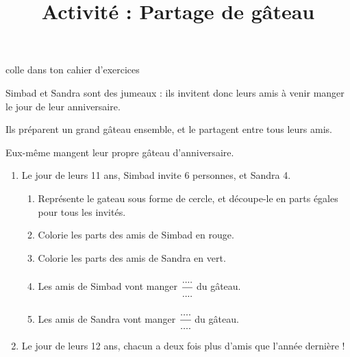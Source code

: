 \documentclass[a4paper,11pt]{article}
\title{Activité : Partage de gâteau}
\date{}
\author{}
\makeatletter
\renewcommand{\maketitle}{%
{\scriptsize colle dans ton cahier d'exercices}
	\begin{center}
		\LARGE
		\uline{\@title}
		\vspace{0.5em}
	\end{center}
}
\makeatother
\begin{document}
\maketitle

\begin{enonce}
	Simbad et Sandra sont des jumeaux : ils invitent donc leurs amis à venir manger le jour de leur anniversaire.

	Ils préparent un grand gâteau ensemble, et le partagent entre tous leurs amis.

	Eux-même mangent leur propre gâteau d'anniversaire.
\end{enonce}

\begin{enumerate}
	\item Le jour de leurs 11 ans, Simbad invite 6 personnes, et Sandra 4.
	      \begin{enumerate}
		      \item Représente le gateau sous forme de cercle, et découpe-le en parts égales pour tous les invités.
		      \item Colorie les parts des amis de Simbad en rouge.
		      \item Colorie les parts des amis de Sandra en vert.
		      \item Les amis de Simbad vont manger $\cfrac{....}{....}$ du gâteau. \vspace{0.5em}
		      \item Les amis de Sandra vont manger $\cfrac{....}{....}$ du gâteau. \vspace{0.5em}
	      \end{enumerate}
	\item Le jour de leurs 12 ans, chacun a deux fois plus d'amis que l'année dernière !


\end{enumerate}
\end{document}

